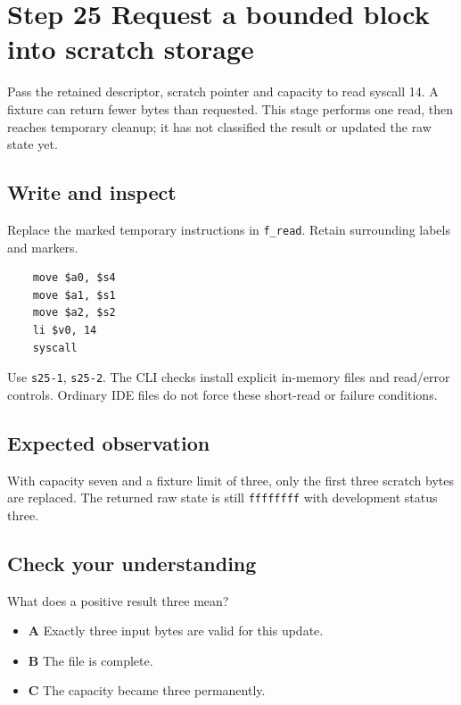 \section{Step 25 Request a bounded block into scratch storage}\label{crc-s25}

Pass the retained descriptor, scratch pointer and capacity to read syscall 14. A fixture can return fewer bytes than requested. This stage performs one read, then reaches temporary cleanup; it has not classified the result or updated the raw state yet.

\subsection{Write and inspect}
Replace the marked temporary instructions in \texttt{f\_read}. Retain surrounding labels and markers.

\begin{verbatim}
    move $a0, $s4
    move $a1, $s1
    move $a2, $s2
    li $v0, 14
    syscall
\end{verbatim}

Use \texttt{s25-1}, \texttt{s25-2}. The CLI checks install explicit in-memory files and read/error controls. Ordinary IDE files do not force these short-read or failure conditions.

\subsection{Expected observation}
With capacity seven and a fixture limit of three, only the first three scratch bytes are replaced. The returned raw state is still \texttt{ffffffff} with development status three.

\subsection{Check your understanding}
What does a positive result three mean?

\begin{itemize}
\item \textbf{A} Exactly three input bytes are valid for this update.
\item \textbf{B} The file is complete.
\item \textbf{C} The capacity became three permanently.
\end{itemize}
